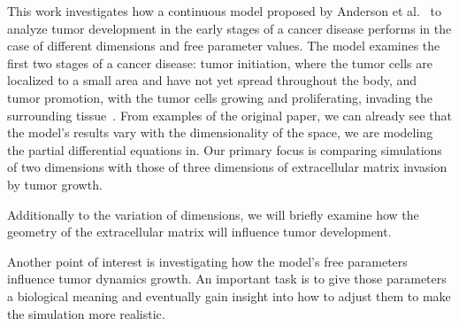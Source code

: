 This work investigates how a continuous model proposed by Anderson et al.~\cite{anderson_continuous_1998,anderson_mathematical_2000} to analyze tumor development in the early stages of a cancer disease performs in the case of different dimensions and free parameter values. The model examines the first two stages of a cancer disease: tumor initiation, where the tumor cells are localized to a small area and have not yet spread throughout the body, and tumor promotion, with the tumor cells growing and proliferating, invading the surrounding tissue~\cite{10.1158/2159-8290.CD-21-1059}. From examples of the original paper, we can already see that the model's results vary with the dimensionality of the space, we are modeling the partial differential equations in. Our primary focus is comparing simulations of two dimensions with those of three dimensions of extracellular matrix invasion by tumor growth. 

Additionally to the variation of dimensions, we will briefly examine how the geometry of the extracellular matrix will influence tumor development.

Another point of interest is investigating how the model's free parameters influence tumor dynamics growth. An important task is to give those parameters a biological meaning and eventually gain insight into how to adjust them to make the simulation more realistic.
